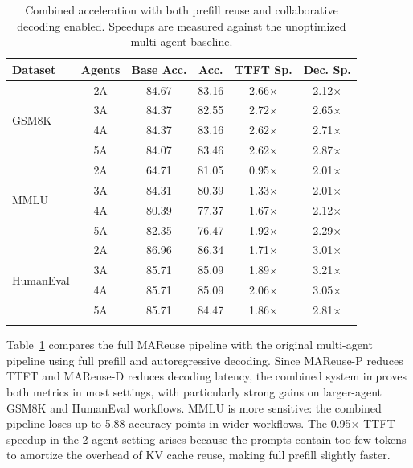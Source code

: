 \documentclass[letterpaper]{article} %
\newcommand{\thickhline}{\noalign{\hrule height 0.8pt}}
\begin{document}
\begin{table}[t]
\centering
\small
\setlength{\tabcolsep}{3.6pt}
\begin{tabular}{lccccc}
\thickhline
\textbf{Dataset} & \textbf{Agents} & \textbf{Base Acc.} & \textbf{Acc.} & \textbf{TTFT Sp.} & \textbf{Dec. Sp.} \\
\hline
\multirow{4}{*}{GSM8K} & 2A & 84.67 & 83.16 & 2.66$\times$ & 2.12$\times$ \\
 & 3A & 84.37 & 82.55 & 2.72$\times$ & 2.65$\times$ \\
 & 4A & 84.37 & 83.16 & 2.62$\times$ & 2.71$\times$ \\
 & 5A & 84.07 & 83.46 & 2.62$\times$ & 2.87$\times$ \\
\hline
\multirow{4}{*}{MMLU} & 2A & 64.71 & 81.05 & 0.95$\times$ & 2.01$\times$ \\
 & 3A & 84.31 & 80.39 & 1.33$\times$ & 2.01$\times$ \\
 & 4A & 80.39 & 77.37 & 1.67$\times$ & 2.12$\times$ \\
 & 5A & 82.35 & 76.47 & 1.92$\times$ & 2.29$\times$ \\
\hline
\multirow{4}{*}{HumanEval} & 2A & 86.96 & 86.34 & 1.71$\times$ & 3.01$\times$ \\
 & 3A & 85.71 & 85.09 & 1.89$\times$ & 3.21$\times$ \\
 & 4A & 85.71 & 85.09 & 2.06$\times$ & 3.05$\times$ \\
 & 5A & 85.71 & 84.47 & 1.86$\times$ & 2.81$\times$ \\
\thickhline
\end{tabular}
\caption{Combined acceleration with both prefill reuse and collaborative decoding enabled. Speedups are measured against the unoptimized multi-agent baseline.}
\label{tab:combined-results}
\end{table}

Table~\ref{tab:combined-results} compares the full MAReuse pipeline with the original multi-agent pipeline using full prefill and autoregressive decoding. Since MAReuse-P reduces TTFT and MAReuse-D reduces decoding latency, the combined system improves both metrics in most settings, with particularly strong gains on larger-agent GSM8K and HumanEval workflows. MMLU is more sensitive: the combined pipeline loses up to 5.88 accuracy points in wider workflows. The 0.95$\times$ TTFT speedup in the 2-agent setting arises because the prompts contain too few tokens to amortize the overhead of KV cache reuse, making full prefill slightly faster.
\end{document}
